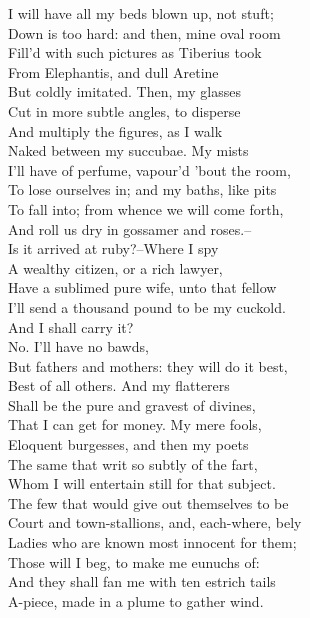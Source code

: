 \documentclass{memoir}
\begin{document}
\begin{drama*}
\mammonspeaks  I will have all my beds blown up, not stuft;\\
 Down is too hard: and then, mine oval room\\
 Fill'd with such pictures as Tiberius took\\
 From Elephantis, and dull Aretine\\
 But coldly imitated. Then, my glasses\\
 Cut in more subtle angles, to disperse\\
 And multiply the figures, as I walk\\
 Naked between my succubae. My mists\\
 I'll have of perfume, vapour'd 'bout the room,\\
 To lose ourselves in; and my baths, like pits\\
 To fall into; from whence we will come forth,\\
 And roll us dry in gossamer and roses.--\\
 Is it arrived at ruby?--Where I spy\\
 A wealthy citizen, or a rich lawyer,\\
 Have a sublimed pure wife, unto that fellow\\
 I'll send a thousand pound to be my cuckold.\\
\facespeaks  And I shall carry it?\\
\mammonspeaks {} No. I'll have no bawds,\\
 But fathers and mothers: they will do it best,\\
 Best of all others. And my flatterers\\
 Shall be the pure and gravest of divines,\\
 That I can get for money. My mere fools,\\
 Eloquent burgesses, and then my poets\\
 The same that writ so subtly of the fart,\\
 Whom I will entertain still for that subject.\\
 The few that would give out themselves to be\\
 Court and town-stallions, and, each-where, bely\\
 Ladies who are known most innocent for them;\\
 Those will I beg, to make me eunuchs of:\\
 And they shall fan me with ten estrich tails\\
 A-piece, made in a plume to gather wind.\\

\end{drama*}
\end{document}
